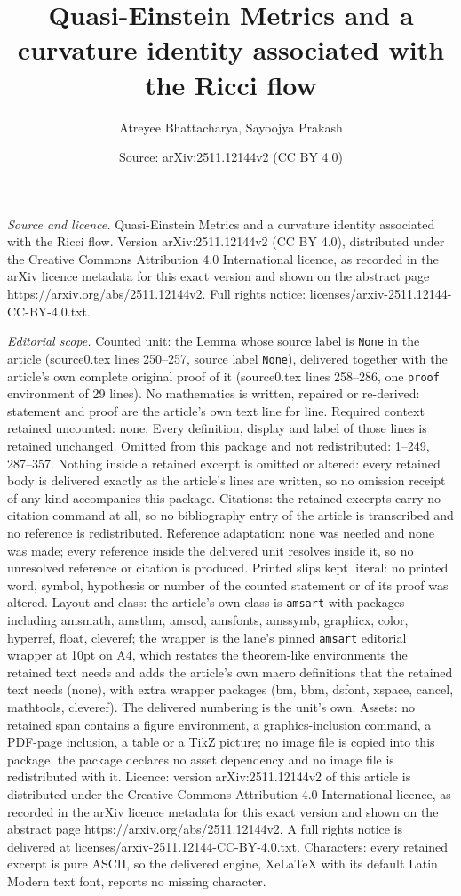 \documentclass[10pt,a4paper]{amsart}
\title[Quasi-Einstein Metrics and a curvature identity associated w]{Quasi-Einstein Metrics and a curvature identity associated with the Ricci flow}
\author{Atreyee Bhattacharya, Sayoojya Prakash}
\date{Source: arXiv:2511.12144v2 (CC BY 4.0)}
\begin{document}
\maketitle

\noindent\emph{Source and licence.} Quasi-Einstein Metrics and a curvature identity associated with the Ricci flow. Version arXiv:2511.12144v2 (CC BY 4.0), distributed under the Creative Commons Attribution 4.0 International licence, as recorded in the arXiv licence metadata for this exact version and shown on the abstract page https://arxiv.org/abs/2511.12144v2. Full rights notice: licenses/arxiv-2511.12144-CC-BY-4.0.txt.\par\smallskip

\noindent\textit{Editorial scope.} Counted unit: the Lemma whose source label is \texttt{None} in the article (source0.tex lines 250--257, source label \texttt{None}), delivered together with the article's own complete original proof of it (source0.tex lines 258--286, one \texttt{proof} environment of 29 lines). No mathematics is written, repaired or re-derived: statement and proof are the article's own text line for line. Required context retained uncounted: none. Every definition, display and label of those lines is retained unchanged. Omitted from this package and not redistributed: 1--249, 287--357. Nothing inside a retained excerpt is omitted or altered: every retained body is delivered exactly as the article's lines are written, so no omission receipt of any kind accompanies this package. Citations: the retained excerpts carry no citation command at all, so no bibliography entry of the article is transcribed and no reference is redistributed. Reference adaptation: none was needed and none was made; every reference inside the delivered unit resolves inside it, so no unresolved reference or citation is produced. Printed slips kept literal: no printed word, symbol, hypothesis or number of the counted statement or of its proof was altered. Layout and class: the article's own class is \texttt{amsart} with packages including amsmath, amsthm, amscd, amsfonts, amssymb, graphicx, color, hyperref, float, cleveref; the wrapper is the lane's pinned \texttt{amsart} editorial wrapper at 10pt on A4, which restates the theorem-like environments the retained text needs and adds the article's own macro definitions that the retained text needs (none), with extra wrapper packages (bm, bbm, dsfont, xspace, cancel, mathtools, cleveref). The delivered numbering is the unit's own. Assets: no retained span contains a figure environment, a graphics-inclusion command, a PDF-page inclusion, a table or a TikZ picture; no image file is copied into this package, the package declares no asset dependency and no image file is redistributed with it. Licence: version arXiv:2511.12144v2 of this article is distributed under the Creative Commons Attribution 4.0 International licence, as recorded in the arXiv licence metadata for this exact version and shown on the abstract page https://arxiv.org/abs/2511.12144v2. A full rights notice is delivered at licenses/arxiv-2511.12144-CC-BY-4.0.txt. Characters: every retained excerpt is pure ASCII, so the delivered engine, XeLaTeX with its default Latin Modern text font, reports no missing character.
\end{document}
